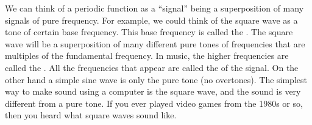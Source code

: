 \documentclass{ximera}
\begin{document}
We can think of a periodic function as a ``signal'' being a superposition of many signals of pure frequency.  For example, we could think of the square wave as a tone of certain base frequency. This base frequency is called the \emph{}. The square wave will be a superposition of many different pure tones of frequencies that are multiples of the fundamental frequency. In music, the higher frequencies are called the \emph{}. All the frequencies that appear are called the \emph{} of the signal. On the other hand a simple sine wave is only the pure tone (no overtones). The simplest way to make sound using a computer is the square wave, and the sound is very different from a pure tone.  If you ever played video games from the 1980s or so, then you heard what square waves sound like.
\end{document}
